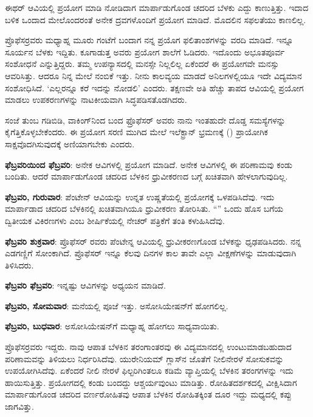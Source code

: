 ಈಥರ್ ಆವಿಯಲ್ಲಿ ಪ್ರಯೋಗ ಮಾಡಿ ನೋಡಿದಾಗ ಮಾರ್ಪಾಡುಗೊಂಡ ಚದರಿದ ಬೆಳಕು ಎದ್ದು ಕಾಣುತ್ತಿತ್ತು. ಇದಾದ ಬಳಿಕ ಒಂದಾದ ಮೇಲೊಂದರಂತೆ ಅನೇಕ ದ್ರವಗಳೊಂದಿಗೆ ಪ್ರಯೋಗ ಮಾಡಿದೆ. ಮೊದಲಿನ ಸಫಲತೆಯು ಕಾಣಲಿಲ್ಲ.

ಪ್ರೊಫೆಸರ್‍ರವರು ಮಧ್ಯಾಹ್ನ ಮೂರು ಗಂಟೆಗೆ ಬಂದಾಗ ನನ್ನ ಪ್ರಯೊಗ ಫಲಿತಾಂಶಗಳನ್ನು ವರದಿ ಮಾಡಿದೆ. ಇನ್ನೂ ಸೂರ್ಯನ ಬೆಳಕು ಇದ್ದಿತು. ಕೂಗಾಡುತ್ತ ಅವರು ಪ್ರಯೋಗ ಶಾಲೆಗೆ ಓಡಿದರು. ಇದೊಂದು ಅಭೂತಪೂರ್ವ ಸಂಶೋಧನೆ ಎನ್ನುತ್ತಿದ್ದರು. ತಮ್ಮ ಉಪನ್ಯಾಸದಲ್ಲಿ ಮನಸ್ಸೇ ನಿಲ್ಲಲಿಲ್ಲ ಏಕೆಂದರೆ ಈ ಪ್ರಯೋಗವೇ ಮನಸ್ಸು ಆವರಿಸಿತ್ತು. ಆದರೂ ನಿನ್ನ ಮೇಲೆ ನಂಬಿಕೆ ಇತ್ತು. ನೀನು ಕಾಲವ್ಯಯ ಮಾಡದೆ ಅನಿಲಗಳಲ್ಲಿಯೂ ಇದೇ ವಿದ್ಯಮಾನ ಸಂಶೋಧಿಸಿದೆ. ‘ಎಲ್ಲರನ್ನೂ ಕರೆ ಇದನ್ನು ನೋಡಲಿ’ ಎಂದರು. ತಕ್ಷಣವೇ ಅತಿ ಹೆಚ್ಚು ತಾಪದ ಆವಿಯಲ್ಲಿ ಪ್ರಯೋಗ ಮಾಡಲು ಉಪಕರಣಗಳನ್ನು ನಾಟಕೀಯವಾಗಿ ಸಿದ್ಧಪಡಿಸತೊಡಗಿದರು.

\newpage

ಸಂಜೆ ತುಂಬ ಗಡಿಬಿಡಿ, ವಾಕಿಂಗ್‍ನಿಂದ ಬಂದ ಫ್ರೊಫೆಸರ್ ಅವರು ನಾನು ಇಂತಹುದೇ ದೊಡ್ಡ ಸಮಸ್ಯೆಗಳನ್ನು ಕೈಗೆತ್ತಿಕೊಳ್ಳಬೇಕೆಂದರು. ಈ ಪ್ರಯೋಗ ಸರಣಿ ಮುಗಿದ ಮೇಲೆ ಇಲೆಕ್ಟ್ರಾನ್ ಭ್ರಮಣಕ್ಕೆ () ಪ್ರಾಯೋಗಿಕ ಸಾಕ್ಷವೊದಗಿಸುವುದಕ್ಕೆ ಅಣಿಯಾಗಬೇಕು ಎಂದರು.

\textbf{ ಫೆಬ್ರವರಿಯಿಂದ\general{\enginline{-}} ಫೆಬ್ರವರಿ}: ಅನೇಕ ಆವಿಗಳಲ್ಲಿ ಪ್ರಯೋಗ ಮಾಡಿದೆ. ಅನೇಕ ಆವಿಗಳಲ್ಲಿ ಈ ಪರಿಣಾಮವು ಕಂಡು ಬಂದಿತು. ಆದರೆ ಮಾರ್ಪಾಡುಗೊಂಡ ಚದರಿದ ಬೆಳಕಿನ ಧ್ರುವೀಕರಣದ ಬಗ್ಗೆ ಖಚಿತವಾಗಿ ಹೇಳಲಾಗುವುದಿಲ್ಲ.

\textbf{ ಫೆಬ್ರವರಿ, ಗುರುವಾರ}: ಪೆಂಟೇನ್ ಆವಿಯನ್ನು ಉನ್ನತ ಉಷ್ಣತೆಯಲ್ಲಿ ಪ್ರಯೋಗಕ್ಕೆ ಒಳಪಡಿಸಿದೆವು. ಇದು ಮಾರ್ಪಾಡಾದ ಚದರಿದ ಬೆಳಕಿನಲ್ಲಿ ಖಚಿತವಾಗಿಯೂ ಧ್ರುವೀಕರಣ ತೋರಿಸಿತು. “\textit{}” ಒಂದು ಹೊಸ ಬಗೆಯ ದ್ವಿತೀಯಕ ವಿಕಿರಣಗಳು ಎಂಬ ಶೀರ್ಷಿಕೆಯಲ್ಲಿ ನೇಚರ್ ಪತ್ರಿಕೆಗೆ ತಂತಿ ಕಳುಹಿಸಿದೆವು.

\textbf{ ಫೆಬ್ರವರಿ ಶುಕ್ರವಾರ}: ಪ್ರೊಫೆಸರ್ ರವರು ಪೆಂಟೇನ್ನ ಆವಿಯಲ್ಲಿ ಧ್ರುವೀಕರಣಗೊಂಡ ಬೆಳಕನ್ನು ಧೃಢಪಡಿಸಿದರು. ನನ್ನ ಎಡಗಣ್ಣಿಗೆ ಸೋಂಕಾಗಿದೆ. ಪ್ರೊಫೆಸರ್ ಇನ್ನೂ ಕೆಲವು ದಿನಗಳ ಕಾಲ ತಾವೇ ಎಲ್ಲಾ ವೀಕ್ಷಣೆಗಳನ್ನು ಮಾಡುವುದಾಗಿ ತಿಳಿಸಿದರು. 

\textbf{ ಫೆಬ್ರವರಿ\general{\enginline{-}} ಫೆಬ್ರವರಿ}: ಇನ್ನಷ್ಟು ಆವಿಗಳನ್ನು ಅಧ್ಯಯನ ಮಾಡಿದೆ.

\textbf{ ಫೆಬ್ರವರಿ, ಸೋಮವಾರ}: ಮನೆಯಲ್ಲಿ ಪೂಜೆ ಇತ್ತು. ಅಸೋಸಿಯೇಷನ್‍ಗೆ ಹೋಗಲಿಲ್ಲ.

\textbf{ ಫೆಬ್ರವರಿ, ಬುಧವಾರ}: ಅಸೋಸಿಯೇಷನ್‍ಗೆ ಮಧ್ಯಾಹ್ನ ಹೋಗಲು ಸಾಧ್ಯವಾಯಿತು.

ಪ್ರೊಫೆಸರ್‍ರವರು ಇದ್ದರು. ನಾವು ಆಪಾತ ಬೆಳಕಿನ ತರಂಗಾಂತರವು ಈ ವಿದ್ಯಮಾನದಲ್ಲಿ ಉಂಟುಮಾಡಬಹುದಾದ ಪರಿಣಾಮವನ್ನು ತಿಳಿಯಲು ನಿರ್ಧರಿಸಿದೆವು. ಯುರೇನಿಯಮ್ ಗ್ಲಾಸ್‍ನ ಜೊತೆಗೆ ನೀಲಿ\enginline{-}ನೇರಳೆ ಸೋಸುಕವನ್ನು ಉಪಯೋಗಿಸಿದೆವು. ಏಕೆಂದರೆ ನೀಲಿ ನೇರಳೆ ಫಿಲ್ಟರಿಗಿಂತಲೂ ಕಡಿಮೆ ವ್ಯಾಪ್ತಿಯಲ್ಲಿ ಬೆಳಕಿನ ತರಂಗಗಳನ್ನು ಇದು ಹಾಯಿಸುತ್ತಿತ್ತು. ಪ್ರಯೋಗದಲ್ಲಿ ಕಂಡು ಬಂದದ್ದು ಆಶ್ಚರ್ಯವುಂಟು ಮಾಡಿತ್ತು. ರೋಹಿತದರ್ಶಕದಲ್ಲಿ ವೀಕ್ಷಿಸಿದಾಗ ಮಾರ್ಪಾಡುಗೊಂಡ ಚದರಿದ ವರ್ಣರೋಹಿತವು ಆಪಾತ ಬೆಳಕಿನ ರೋಹಿತಕ್ಕಿಂತ ದೂರ ಇದ್ದು ಮಧ್ಯದಲ್ಲಿ ಕಪ್ಪು ಜಾಗವಿತ್ತು.

